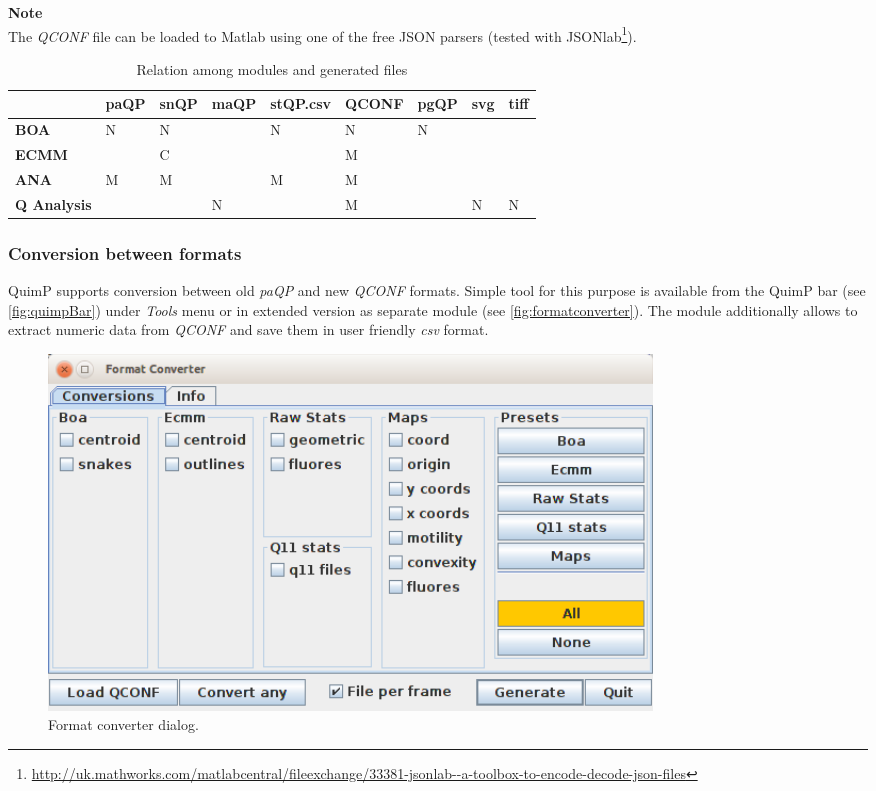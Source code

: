 \documentclass[a4paper,12pt]{article}
\begin{document}
\textbf{Note} \\
The \textit{QCONF} file can be loaded to Matlab using one of the free JSON parsers (tested with JSONlab\footnote{\url{http://uk.mathworks.com/matlabcentral/fileexchange/33381-jsonlab--a-toolbox-to-encode-decode-json-files}}).

\begin{table}[h]
	\centering
	\caption{Relation among modules and generated files}
	\label{filestable}
	\begin{tabular}{|l|l|l|l|l|l|l|l|l|}
		&  \textbf{paQP}&  \textbf{snQP}&  \textbf{maQP}&  \textbf{stQP.csv}&  \textbf{QCONF}&  \textbf{pgQP}& \textbf{svg}&  \textbf{tiff}\\ \hline
		\textbf{BOA} &   N&  N&  &  N&  N&  N&  &  \\
		\textbf{ECMM}&    &  C&  &   &  M&   &  &  \\
		\textbf{ANA} &   M&  M&  &  M&  M&   &  &  \\
		\textbf{Q Analysis}&  &  &  N&  &  M&  &  N& N 
	\end{tabular}
\end{table}


\subsubsection{Conversion between formats}
\label{sec:ConversionBetweenFormats}
QuimP supports conversion between old \textit{paQP} and new \textit{QCONF} formats. Simple tool for this purpose is available from the QuimP bar (see \autoref{fig:quimpBar}) under \textit{Tools} menu or in extended version as separate module (see \autoref{fig:formatconverter}). The module additionally allows to extract numeric data from \textit{QCONF} and save them in user friendly \textit{csv} format.

\begin{figure}[h]
	\centering
	\includegraphics[width=16cm]{fcWindow.png} 
	\caption{Format converter dialog.}
	\label{fig:formatconverter}
\end{figure}
\end{document}
